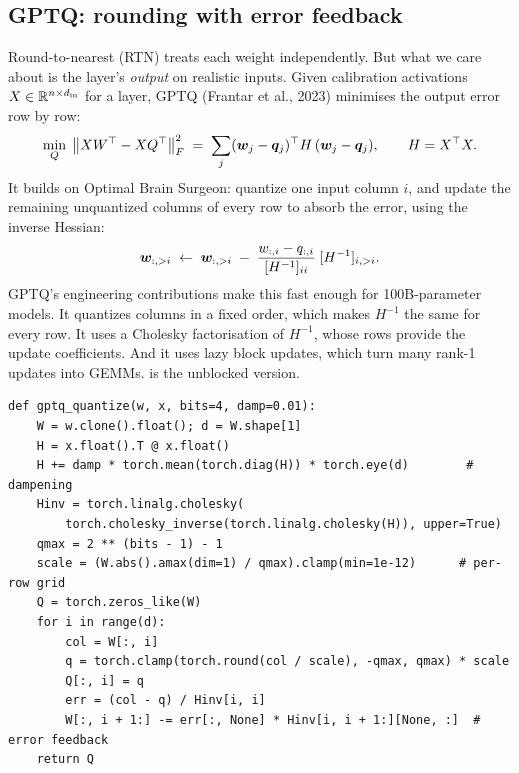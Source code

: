 \subsection{GPTQ: rounding with error feedback}
Round-to-nearest (RTN) treats each weight independently. But what we care about is the
layer's \emph{output} on realistic inputs. Given calibration activations
$X\in\mathbb{R}^{n\times d_{\text{in}}}$ for a layer, GPTQ (Frantar et al., 2023) minimises the
output error row by row:
\begin{equation}
  \min_{Q}\; \big\| X W^\top - X Q^\top \big\|_F^2
  \;=\; \sum_j (\bm{w}_j - \bm{q}_j)^\top H\, (\bm{w}_j - \bm{q}_j),
  \qquad H = X^\top X .
  \label{eq:efficient:gptq}
\end{equation}
It builds on Optimal Brain Surgeon: quantize one input column $i$, and update the
remaining unquantized columns of every row to absorb the error, using the inverse
Hessian:
\begin{equation}
  \bm{w}_{:,>i} \;\leftarrow\; \bm{w}_{:,>i} \;-\;
  \frac{w_{:,i}-q_{:,i}}{[H^{-1}]_{ii}}\; [H^{-1}]_{i,>i} .
\end{equation}
GPTQ's engineering contributions make this fast enough for 100B-parameter models. It
quantizes columns in a fixed order, which makes $H^{-1}$ the same for every row. It
uses a Cholesky factorisation of $H^{-1}$, whose rows provide the update coefficients.
And it uses lazy block updates, which turn many rank-1 updates into GEMMs.
 is the unblocked version.

\begin{lstlisting}[caption={GPTQ without lazy batching. On correlated calibration
inputs it gives lower output error than RTN on the same grid.},label={lst:efficient:gptq}]
def gptq_quantize(w, x, bits=4, damp=0.01):
    W = w.clone().float(); d = W.shape[1]
    H = x.float().T @ x.float()
    H += damp * torch.mean(torch.diag(H)) * torch.eye(d)        # dampening
    Hinv = torch.linalg.cholesky(
        torch.cholesky_inverse(torch.linalg.cholesky(H)), upper=True)
    qmax = 2 ** (bits - 1) - 1
    scale = (W.abs().amax(dim=1) / qmax).clamp(min=1e-12)      # per-row grid
    Q = torch.zeros_like(W)
    for i in range(d):
        col = W[:, i]
        q = torch.clamp(torch.round(col / scale), -qmax, qmax) * scale
        Q[:, i] = q
        err = (col - q) / Hinv[i, i]
        W[:, i + 1:] -= err[:, None] * Hinv[i, i + 1:][None, :]  # error feedback
    return Q
\end{lstlisting}

